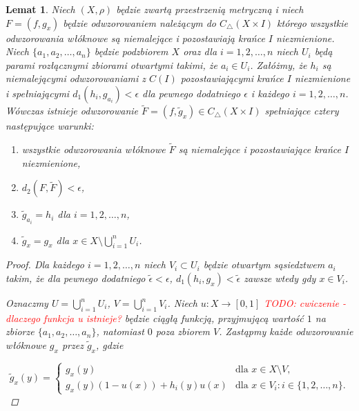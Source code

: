 \documentclass[licencjacka]{pwr_wmat_praca_dyplomowa}
\theoremstyle{plain}
\numberwithin{theorem}{chapter}
\newtheorem{lemma}[theorem]{Lemat}
\theoremstyle{definition}
\numberwithin{theorem}{chapter}
\begin{document}
\begin{lemma}
\label{lemat_4_glownego_artykulu}
\cite{alseda1999entropy}
Niech $(X, \rho)$ będzie zwartą przestrzenią metryczną i niech $F = (f, g_x)$ będzie odwzorowaniem należącym do $C_\triangle(X \times I)$ którego wszystkie odwzorowania włóknowe są niemalejące i pozostawiają krańce $I$ niezmienione. Niech $\{a_1, a_2, \ldots, a_n\}$ będzie podzbiorem $X$ oraz dla $i = 1, 2, \ldots, n$ niech $U_i$ będą parami rozłącznymi zbiorami otwartymi takimi, że $a_i \in U_i$. Załóżmy, że $h_i$ są niemalejącymi odwzorowaniami z $C(I)$ pozostawiającymi krańce $I$ niezmienione i spełniającymi $d_1(h_i, g_{a_i}) < \epsilon$ dla pewnego dodatniego $\epsilon$ i każdego $i = 1, 2, \ldots, n$. Wówczas istnieje odwzorowanie $\widetilde{F} = (f, \widetilde{g}_x) \in C_\triangle(X \times I)$ spełniające cztery następujące warunki:

\begin{enumerate}
\item  wszystkie odwzorowania włóknowe $\widetilde{F}$ są niemalejące i pozostawiające krańce $I$ niezmienione,
\item $d_2(F, \widetilde{F}) < \epsilon$,
\item $\widetilde{g}_{a_i} = h_i$ dla $i = 1,2,\ldots,n$,
\item $\widetilde{g}_x = g_x$ dla $x \in X \setminus \bigcup_{i=1}^n U_i$.
\end{enumerate}

\begin{proof}
\cite{alseda1999entropy}
Dla każdego $i = 1, 2, \ldots, n$ niech $V_i \subset U_i$ będzie otwartym sąsiedztwem $a_i$ takim, że dla pewnego dodatniego $\widetilde{\epsilon} < \epsilon$, $d_1(h_i, g_x) < \widetilde{\epsilon}$ zawsze wtedy gdy $x \in V_i$.

Oznaczmy $U = \bigcup_{i=1}^n U_i$, $V = \bigcup_{i=1}^n V_i$. Niech $u : X \longrightarrow [0,1]$ \textcolor{red}{TODO: cwiczenie - dlaczego funkcja u istnieje?} będzie ciągłą funkcją, przyjmującą wartość $1$ na zbiorze $\{a_1, a_2, \ldots, a_n\}$, natomiast $0$ poza zbiorem $V$. Zastąpmy każde odwzorowanie włóknowe $g_x$ przez $\widetilde{g}_x$, gdzie

\begin{equation} \label{lemat4_rownanie_1}
    \widetilde{g}_x(y) =
    \begin{cases}
        g_x(y) & \text{dla $x \in X \setminus V$,}\\
        g_x(y)(1-u(x))+h_i(y)u(x) & \text{dla $x \in V_i : i \in \{1,2,\ldots,n\}$.}
    \end{cases}
\end{equation}


\end{proof}
\end{lemma}
\end{document}
